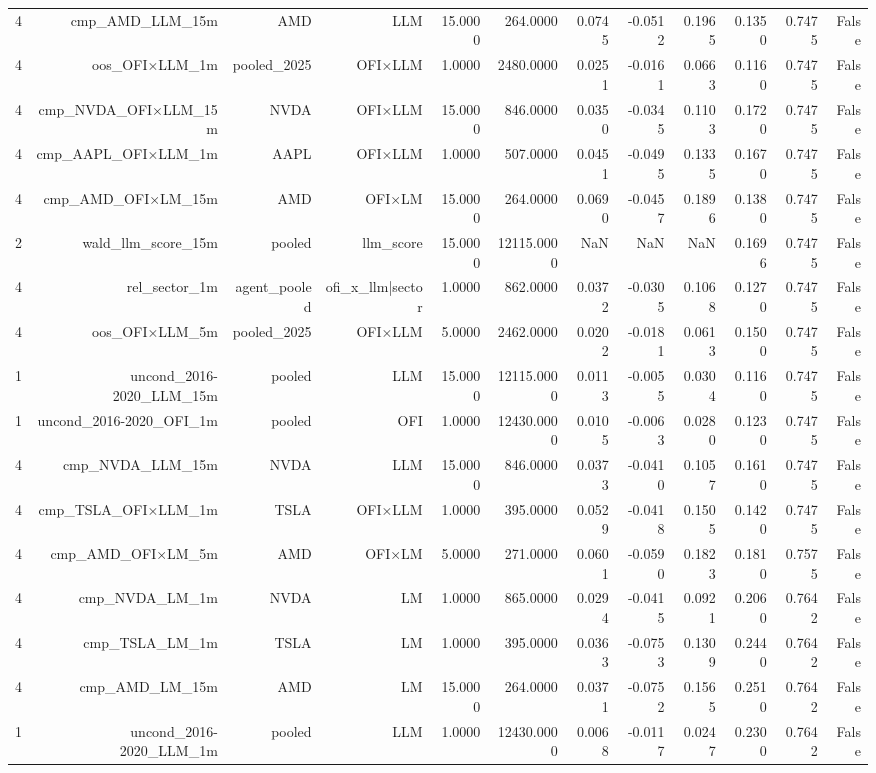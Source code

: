 \begin{table}[htbp]
\begin{tabular}{lrrrrrrrrrrr}
4 & cmp\_AMD\_LLM\_15m & AMD & LLM & 15.0000 & 264.0000 & 0.0745 & -0.0512 & 0.1965 & 0.1350 & 0.7475 & False \\
4 & oos\_OFI×LLM\_1m & pooled\_2025 & OFI×LLM & 1.0000 & 2480.0000 & 0.0251 & -0.0161 & 0.0663 & 0.1160 & 0.7475 & False \\
4 & cmp\_NVDA\_OFI×LLM\_15m & NVDA & OFI×LLM & 15.0000 & 846.0000 & 0.0350 & -0.0345 & 0.1103 & 0.1720 & 0.7475 & False \\
4 & cmp\_AAPL\_OFI×LLM\_1m & AAPL & OFI×LLM & 1.0000 & 507.0000 & 0.0451 & -0.0495 & 0.1335 & 0.1670 & 0.7475 & False \\
4 & cmp\_AMD\_OFI×LM\_15m & AMD & OFI×LM & 15.0000 & 264.0000 & 0.0690 & -0.0457 & 0.1896 & 0.1380 & 0.7475 & False \\
2 & wald\_llm\_score\_15m & pooled & llm\_score & 15.0000 & 12115.0000 & NaN & NaN & NaN & 0.1696 & 0.7475 & False \\
4 & rel\_sector\_1m & agent\_pooled & ofi\_x\_llm|sector & 1.0000 & 862.0000 & 0.0372 & -0.0305 & 0.1068 & 0.1270 & 0.7475 & False \\
4 & oos\_OFI×LLM\_5m & pooled\_2025 & OFI×LLM & 5.0000 & 2462.0000 & 0.0202 & -0.0181 & 0.0613 & 0.1500 & 0.7475 & False \\
1 & uncond\_2016-2020\_LLM\_15m & pooled & LLM & 15.0000 & 12115.0000 & 0.0113 & -0.0055 & 0.0304 & 0.1160 & 0.7475 & False \\
1 & uncond\_2016-2020\_OFI\_1m & pooled & OFI & 1.0000 & 12430.0000 & 0.0105 & -0.0063 & 0.0280 & 0.1230 & 0.7475 & False \\
4 & cmp\_NVDA\_LLM\_15m & NVDA & LLM & 15.0000 & 846.0000 & 0.0373 & -0.0410 & 0.1057 & 0.1610 & 0.7475 & False \\
4 & cmp\_TSLA\_OFI×LLM\_1m & TSLA & OFI×LLM & 1.0000 & 395.0000 & 0.0529 & -0.0418 & 0.1505 & 0.1420 & 0.7475 & False \\
4 & cmp\_AMD\_OFI×LM\_5m & AMD & OFI×LM & 5.0000 & 271.0000 & 0.0601 & -0.0590 & 0.1823 & 0.1810 & 0.7575 & False \\
4 & cmp\_NVDA\_LM\_1m & NVDA & LM & 1.0000 & 865.0000 & 0.0294 & -0.0415 & 0.0921 & 0.2060 & 0.7642 & False \\
4 & cmp\_TSLA\_LM\_1m & TSLA & LM & 1.0000 & 395.0000 & 0.0363 & -0.0753 & 0.1309 & 0.2440 & 0.7642 & False \\
4 & cmp\_AMD\_LM\_15m & AMD & LM & 15.0000 & 264.0000 & 0.0371 & -0.0752 & 0.1565 & 0.2510 & 0.7642 & False \\
1 & uncond\_2016-2020\_LLM\_1m & pooled & LLM & 1.0000 & 12430.0000 & 0.0068 & -0.0117 & 0.0247 & 0.2300 & 0.7642 & False \\

\end{tabular}
\end{table}

